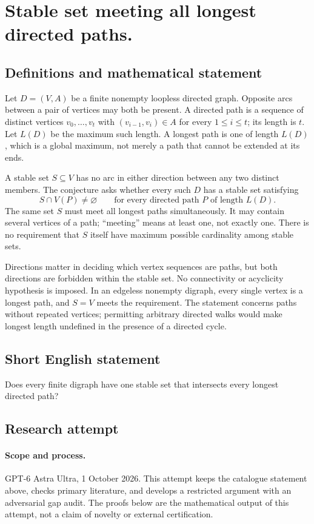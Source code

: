 \documentclass[11pt,a4paper]{article}
\begin{document}
\section*{Stable set meeting all longest directed paths.}\label{statement}

\subsection{Definitions and mathematical statement}
Let $D=(V,A)$ be a finite nonempty loopless directed graph. Opposite
arcs between a pair of vertices may both be present. A directed path
is a sequence of distinct vertices $v_0,\ldots,v_t$ with
$(v_{i-1},v_i)\in A$ for every $1\le i\le t$; its length is $t$.
Let $L(D)$ be the maximum such length. A longest path is one of length
$L(D)$, which is a global maximum, not merely a path that cannot be
extended at its ends.

A stable set $S\subseteq V$ has no arc in either direction between
any two distinct members. The conjecture asks whether every such
$D$ has a stable set satisfying
\[
 S\cap V(P)\ne\varnothing
          \qquad\text{for every directed path }P\text{ of length }L(D).
\]
The same set $S$ must meet all longest paths simultaneously. It may
contain several vertices of a path; ``meeting'' means at least one,
not exactly one. There is no requirement that $S$ itself have maximum
possible cardinality among stable sets.

Directions matter in deciding which vertex sequences are paths, but
both directions are forbidden within the stable set. No connectivity
or acyclicity hypothesis is imposed. In an edgeless nonempty digraph,
every single vertex is a longest path, and $S=V$ meets the requirement.
The statement concerns paths without repeated vertices; permitting
arbitrary directed walks would make longest length undefined in the
presence of a directed cycle.
\subsection{Short English statement}
Does every finite digraph have one stable set that intersects every longest directed path?
\subsection{Research attempt}
\paragraph{Scope and process.}
GPT-6 Astra Ultra, 1 October 2026. This attempt keeps the catalogue statement above, checks primary literature, and develops a restricted argument with an adversarial gap audit. The proofs below are the mathematical output of this attempt, not a claim of novelty or external certification.
\end{document}
